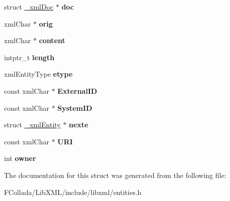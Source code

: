 \begin{DoxyCompactItemize}
\item 
\hypertarget{struct__xmlEntity_adfa8770d70ba762a556cc525b578232a}{
struct \hyperlink{struct__xmlDoc}{\_\-xmlDoc} $\ast$ {\bfseries doc}}
\label{struct__xmlEntity_adfa8770d70ba762a556cc525b578232a}

\item 
\hypertarget{struct__xmlEntity_a0d61b0e8cf6a2b5c5a93bba7de2c389a}{
xmlChar $\ast$ {\bfseries orig}}
\label{struct__xmlEntity_a0d61b0e8cf6a2b5c5a93bba7de2c389a}

\item 
\hypertarget{struct__xmlEntity_a3a6e1d76537e03d0187f264e9c2cc6c5}{
xmlChar $\ast$ {\bfseries content}}
\label{struct__xmlEntity_a3a6e1d76537e03d0187f264e9c2cc6c5}

\item 
\hypertarget{struct__xmlEntity_a7153167f8efad75db8b07ed9a51f34da}{
intptr\_\-t {\bfseries length}}
\label{struct__xmlEntity_a7153167f8efad75db8b07ed9a51f34da}

\item 
\hypertarget{struct__xmlEntity_a7c77f01ae8584f35322960c9af2c44f1}{
xmlEntityType {\bfseries etype}}
\label{struct__xmlEntity_a7c77f01ae8584f35322960c9af2c44f1}

\item 
\hypertarget{struct__xmlEntity_a88219df7a050603dace4d7927295550c}{
const xmlChar $\ast$ {\bfseries ExternalID}}
\label{struct__xmlEntity_a88219df7a050603dace4d7927295550c}

\item 
\hypertarget{struct__xmlEntity_a151ac2dba106b8037c9c3caef0b3800e}{
const xmlChar $\ast$ {\bfseries SystemID}}
\label{struct__xmlEntity_a151ac2dba106b8037c9c3caef0b3800e}

\item 
\hypertarget{struct__xmlEntity_a0e15a609099a953539fba75528f9a1aa}{
struct \hyperlink{struct__xmlEntity}{\_\-xmlEntity} $\ast$ {\bfseries nexte}}
\label{struct__xmlEntity_a0e15a609099a953539fba75528f9a1aa}

\item 
\hypertarget{struct__xmlEntity_a5b15c128b50ab54749a65045966f50a5}{
const xmlChar $\ast$ {\bfseries URI}}
\label{struct__xmlEntity_a5b15c128b50ab54749a65045966f50a5}

\item 
\hypertarget{struct__xmlEntity_ae649c00dd7685e9ec5cdc8e907fb62e7}{
int {\bfseries owner}}
\label{struct__xmlEntity_ae649c00dd7685e9ec5cdc8e907fb62e7}

\end{DoxyCompactItemize}


The documentation for this struct was generated from the following file:\begin{DoxyCompactItemize}
\item 
FCollada/LibXML/include/libxml/entities.h\end{DoxyCompactItemize}
